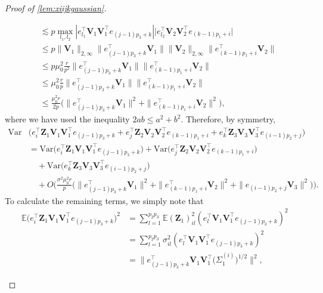 \documentclass[10pt]{article}
\newcommand{\0}{{\mathbf{0}}}
\newcommand{\1}{{\mathbf{1}}}
\newcommand{\E}{{\mathbf{E}}}
\renewcommand{\t}{^{\top}}
\renewcommand{\E}{\mathbb{E}}
\begin{document}
\begin{proof}[Proof of \cref{lem:xiijkgaussian}]
\begin{itemize}
\begin{align*}
     &\lesssim p \max_{l_1,l_2}| e_{l_1}\t \mathbf{V}_1 \mathbf{V}_1\t e_{(j-1)p_3 + k} | \big| e_{l_2}\t \mathbf{V}_2 \mathbf{V}_2\t e_{(k-1)p_1 + i} \big| \\
     &\leq p \| \mathbf{V}_1 \|_{2,\infty} \|e_{(j-1)p_3 + k} \t \mathbf{V}_1 \| \| \mathbf{V}_2 \|_{2,\infty} \|e_{(k-1)p_1 + i}\t \mathbf{V}_2 \| \\
     &\leq p \mu_0^2 \frac{r}{p^2} \|e_{(j-1)p_3 + k} \t \mathbf{V}_1 \|\|e_{(k-1)p_1 + i}\t \mathbf{V}_2 \| \\
     &\leq \mu_0^2 \frac{r}{p}  \|e_{(j-1)p_3 + k} \t \mathbf{V}_1 \|\|e_{(k-1)p_1 + i}\t \mathbf{V}_2 \| \\
     &\leq \frac{\mu_0^2 r}{2p} \bigg(  \|e_{(j-1)p_3 + k} \t \mathbf{V}_1 \|^2 + \|e_{(k-1)p_1 + i}\t \mathbf{V}_2 \|^2\bigg),
\end{align*}
where we have used the inequality $2ab \leq a^2 + b^2$.  Therefore, by symmetry,
\begin{align*}
    \mathrm{Var}&\bigg( e_i\t \mathbf{Z}_1 \mathbf{V}_1 \mathbf{V}_1\t e_{(j-1)p_3 + k} + e_j\t \mathbf{Z}_2 \mathbf{V}_2 \mathbf{V}_2\t e_{(k-1)p_1 + i} + e_k\t \mathbf{Z}_3 \mathbf{V}_3 \mathbf{V}_3\t e_{(i-1)p_2 + j} \bigg) \\
    &= \mathrm{Var}\bigg( e_i\t \mathbf{Z}_1 \mathbf{V}_1 \mathbf{V}_1\t e_{(j-1)p_3 + k}\bigg) + \mathrm{Var}\bigg( e_j\t \mathbf{Z}_2 \mathbf{V}_2 \mathbf{V}_2\t e_{(k-1)p_1 + i} \bigg) \\
    &\quad + \mathrm{Var}\bigg( e_k\t \mathbf{Z}_3 \mathbf{V}_3 \mathbf{V}_3\t e_{(i-1)p_2 + j} \bigg) \\
    &\quad + O\bigg( \frac{\sigma^2 \mu_0^2 r}{p} \bigg(  \|e_{(j-1)p_3 + k} \t \mathbf{V}_1 \|^2 + \|e_{(k-1)p_1 + i}\t \mathbf{V}_2 \|^2 + \| e_{(i-1)p_2 + j} \mathbf{V}_3 \|^2 \bigg) \bigg).
\end{align*}
To calculate the remaining terms, we simply note that
\begin{align*}
    \E \bigg(e_i\t \mathbf{Z}_1 \mathbf{V}_1 \mathbf{V}_1\t e_{(j-1)p_3 + k}\bigg)^2 &= \sum_{l=1}^{p_2p_3} \E (\mathbf{Z}_1)_{il}^2 ( e_l\t \mathbf{V}_1 \mathbf{V}_1\t e_{(j-1)p_3 + k} )^2 \\
    &= \sum_{l=1}^{p_2p_3} \sigma^2_{il} ( e_l\t \mathbf{V}_1 \mathbf{V}_1\t e_{(j-1)p_3 + k} )^2 \\
    &= \| e_{(j-1)p_3 + k}\t \mathbf{V}_1 \mathbf{V}_1\t\big( \Sigma^{(i)}_1\big)^{1/2} \|^2,%
\end{align*}

\end{itemize}
\end{proof}
\end{document}
